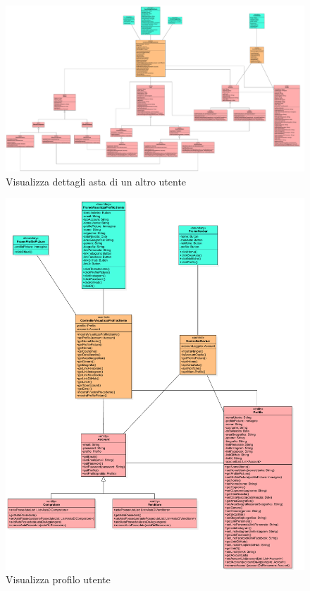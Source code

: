             \begin{figure}[htbp!]
                \centering
                    \includegraphics[width=1\linewidth]{Immagini/Diagrammi/Class Diagram/Utente generico/VisualizzaDettagliAstaUtente.pdf}
                \caption{Visualizza dettagli asta di un altro utente}
            \end{figure}
            
            \begin{figure}[htbp!]
                \centering
                    \includegraphics[width=1\linewidth]{Immagini/Diagrammi/Class Diagram/Utente generico/VisualizzaProfiloUtente.pdf}
                \caption{Visualizza profilo utente}
            \end{figure}
            
